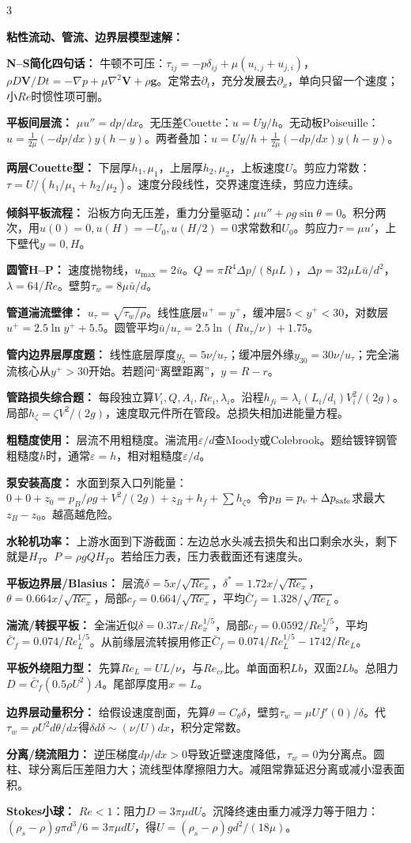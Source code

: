 \documentclass[a4paper]{article}
\newcommand{\sect}[1]{\par{\bfseries\color{Q}#1：}}
\begin{document}
\begin{multicols}{3}
{\sect{粘性流动、管流、边界层模型速解}
\sect{N--S简化四句话}
牛顿不可压：$\tau_{ij}=-p\delta_{ij}+\mu(u_{i,j}+u_{j,i})$，$\rho D\bm V/Dt=-\nabla p+\mu\nabla^2\bm V+\rho\bm g$。定常去$\partial_t$，充分发展去$\partial_x$，单向只留一个速度；小$Re$时惯性项可删。
\sect{平板间层流}
$\mu u''=dp/dx$。无压差Couette：$u=Uy/h$。无动板Poiseuille：$u=\frac{1}{2\mu}(-dp/dx)y(h-y)$。两者叠加：$u=Uy/h+\frac{1}{2\mu}(-dp/dx)y(h-y)$。
\sect{两层Couette型}
下层厚$h_1,\mu_1$，上层厚$h_2,\mu_2$，上板速度$U$。剪应力常数：$\tau=U/(h_1/\mu_1+h_2/\mu_2)$。速度分段线性，交界速度连续，剪应力连续。
\sect{倾斜平板流程}
沿板方向无压差，重力分量驱动：$\mu u''+\rho g\sin\theta=0$。积分两次，用$u(0)=0,u(H)=-U_0,u(H/2)=0$求常数和$U_0$。剪应力$\tau=\mu u'$，上下壁代$y=0,H$。
\sect{圆管H--P}
速度抛物线，$u_{\max}=2\bar u$。$Q=\pi R^4\Delta p/(8\mu L)$，$\Delta p=32\mu L\bar u/d^2$，$\lambda=64/Re$。壁剪$\tau_w=8\mu\bar u/d$。
\sect{管道湍流壁律}
$u_\tau=\sqrt{\tau_w/\rho}$。线性底层$u^+=y^+$，缓冲层$5<y^+<30$，对数层$u^+=2.5\ln y^+ +5.5$。圆管平均$\bar u/u_\tau=2.5\ln(Ru_\tau/\nu)+1.75$。
\sect{管内边界层厚度题}
线性底层厚度$y_5=5\nu/u_\tau$；缓冲层外缘$y_{30}=30\nu/u_\tau$；完全湍流核心从$y^+>30$开始。若题问“离壁距离”，$y=R-r$。
\sect{管路损失综合题}
每段独立算$V_i,Q,A_i,Re_i,\lambda_i$。沿程$h_{fi}=\lambda_i(L_i/d_i)V_i^2/(2g)$。局部$h_\zeta=\zeta V^2/(2g)$，速度取元件所在管段。总损失相加进能量方程。
\sect{粗糙度使用}
层流不用粗糙度。湍流用$\varepsilon/d$查Moody或Colebrook。题给镀锌钢管粗糙度$h$时，通常$\varepsilon=h$，相对粗糙度$\varepsilon/d$。
\sect{泵安装高度}
水面到泵入口列能量：$0+0+z_0=p_B/\rho g+V^2/(2g)+z_B+h_f+\sum h_\zeta$。令$p_B=p_v+\Delta p_{\rm safe}$求最大$z_B-z_0$。越高越危险。
\sect{水轮机功率}
上游水面到下游截面：左边总水头减去损失和出口剩余水头，剩下就是$H_T$。$P=\rho gQH_T$。若给压力表，压力表截面还有速度头。
\sect{平板边界层/Blasius}
层流$\delta=5x/\sqrt{Re_x}$，$\delta^*=1.72x/\sqrt{Re_x}$，$\theta=0.664x/\sqrt{Re_x}$，局部$c_f=0.664/\sqrt{Re_x}$，平均$\bar C_f=1.328/\sqrt{Re_L}$。
\sect{湍流/转捩平板}
全湍近似$\delta=0.37x/Re_x^{1/5}$，局部$c_f=0.0592/Re_x^{1/5}$，平均$\bar C_f=0.074/Re_L^{1/5}$。从前缘层流转捩用修正$\bar C_f=0.074/Re_L^{1/5}-1742/Re_L$。
\sect{平板外绕阻力型}
先算$Re_L=UL/\nu$，与$Re_{cr}$比。单面面积$Lb$，双面$2Lb$。总阻力$D=\bar C_f(0.5\rho U^2)A$。尾部厚度用$x=L$。
\sect{边界层动量积分}
给假设速度剖面，先算$\theta=C_\theta\delta$，壁剪$\tau_w=\mu U f'(0)/\delta$。代$\tau_w=\rho U^2d\theta/dx$得$\delta d\delta\sim(\nu/U)dx$，积分定常数。
\sect{分离/绕流阻力}
逆压梯度$dp/dx>0$导致近壁速度降低，$\tau_w=0$为分离点。圆柱、球分离后压差阻力大；流线型体摩擦阻力大。减阻常靠延迟分离或减小湿表面积。
\sect{Stokes小球}
$Re<1$：阻力$D=3\pi\mu dU$。沉降终速由重力减浮力等于阻力：$(\rho_s-\rho)g\pi d^3/6=3\pi\mu dU$，得$U=(\rho_s-\rho)gd^2/(18\mu)$。

}
\end{multicols}
\end{document}
